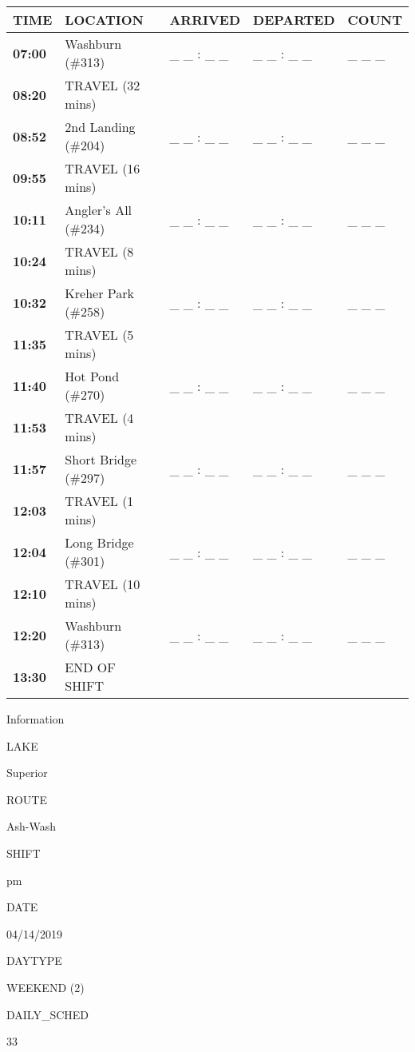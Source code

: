 \documentclass[]{article}
\begin{document}
\begin{tabular}{>{\bfseries}lllll}
\toprule
\textbf{TIME} & \textbf{LOCATION} & \textbf{ARRIVED} & \textbf{DEPARTED} & \textbf{COUNT}\\
\midrule
07:00 & Washburn (\#313) & \_ \_ : \_ \_ & \_ \_ : \_ \_ & \_ \_ \_\\
08:20 & TRAVEL (32 mins) &  &  & \\
08:52 & 2nd Landing (\#204) & \_ \_ : \_ \_ & \_ \_ : \_ \_ & \_ \_ \_\\
09:55 & TRAVEL (16 mins) &  &  & \\
10:11 & Angler's All (\#234) & \_ \_ : \_ \_ & \_ \_ : \_ \_ & \_ \_ \_\\
10:24 & TRAVEL (8 mins) &  &  & \\
10:32 & Kreher Park (\#258) & \_ \_ : \_ \_ & \_ \_ : \_ \_ & \_ \_ \_\\
11:35 & TRAVEL (5 mins) &  &  & \\
11:40 & Hot Pond (\#270) & \_ \_ : \_ \_ & \_ \_ : \_ \_ & \_ \_ \_\\
11:53 & TRAVEL (4 mins) &  &  & \\
11:57 & Short Bridge (\#297) & \_ \_ : \_ \_ & \_ \_ : \_ \_ & \_ \_ \_\\
12:03 & TRAVEL (1 mins) &  &  & \\
12:04 & Long Bridge (\#301) & \_ \_ : \_ \_ & \_ \_ : \_ \_ & \_ \_ \_\\
12:10 & TRAVEL (10 mins) &  &  & \\
12:20 & Washburn (\#313) & \_ \_ : \_ \_ & \_ \_ : \_ \_ & \_ \_ \_\\
13:30 & END OF SHIFT &  &  & \\
\bottomrule
\end{tabular}\newpage

Information

LAKE

Superior

ROUTE

Ash-Wash

SHIFT

pm

DATE

04/14/2019

DAYTYPE

WEEKEND (2)

DAILY\_SCHED

33

\vspace{24pt}
\end{document}
